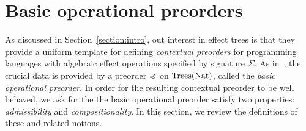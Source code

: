 \section{Basic operational preorders}
\label{section:basic}

As discussed in Section~\ref{section:intro}, out  interest in effect trees is that they provide a 
uniform template for defining 
 \emph{contextual preorders} for programming languages with algebraic effect operations
specified by signature $\Sigma$. 
As in~\cite{gom}, the crucial data is provided by a 
preorder  $\preccurlyeq$  on  $\textnormal{Trees}(\textnormal{Nat})$, called the \emph{basic operational preorder}.  
In order for the resulting contextual preorder to be well behaved, we ask for the 
the basic operational preorder satisfy two properties: \emph{admissibility} and \emph{compositionality}.
In this section, we review the definitions of these and related notions. 

